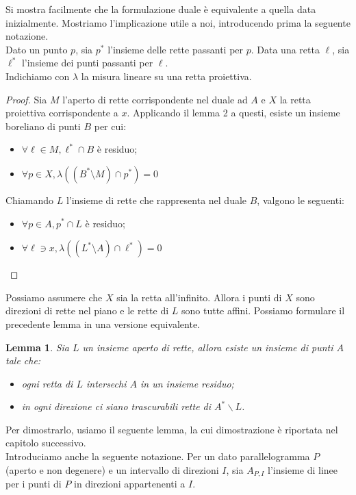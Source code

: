\documentclass[a4paper, twoside,openright]{article}
\newcommand{\fa}{\forall}
\newcommand{\<}{\langle}
\renewcommand{\>}{\rangle}
\newtheorem{lemma}[teo]{Lemma}
\begin{document}
	Si mostra facilmente che la formulazione duale è equivalente a quella data inizialmente. Mostriamo l'implicazione utile a noi, introducendo prima la seguente notazione.\\
	Dato un punto $p$, sia $p^*$ l'insieme delle rette passanti per $p$. Data una retta $\ell$, sia $\ell^*$ l'insieme dei punti passanti per $\ell$.\\
	Indichiamo con $\lambda$ la misura lineare su una retta proiettiva.
	
\begin{proof} 
	Sia $M$ l'aperto di rette corrispondente nel duale ad $A$ e $X$ la retta proiettiva corrispondente a $x$. Applicando il lemma 2 a questi, esiste un insieme boreliano di punti $B$ per cui:
	\begin{itemize}
		\item $\fa \ell \in M, \ell^* \cap B$ è residuo;
		\item $\fa p \in X, \lambda((B^* \setminus M) \cap p^*)=0$
	\end{itemize}
	Chiamando $L$ l'insieme di rette che rappresenta nel duale $B$, valgono le seguenti:
	\begin{itemize}
		\item 	$\fa p \in A, p^* \cap L$ è residuo;
		\item 	$\fa \ell \ni x, \lambda((L^* \setminus A) \cap \ell^*)=0$
	\end{itemize}
\end{proof}

Possiamo assumere che $X$ sia la retta all'infinito. Allora i punti di $X$ sono direzioni di rette nel piano e le rette di $L$ sono tutte affini. Possiamo formulare il precedente lemma in una versione equivalente.

\begin{lemma}
Sia $L$ un insieme aperto di rette, allora esiste un insieme di punti $A$ tale che:
\begin{itemize}
	\item ogni retta di $L$ intersechi $A$ in un insieme residuo;
	\item in ogni direzione ci siano trascurabili rette di  $A^{*} \backslash L$.
\end{itemize}
\end{lemma}

Per dimostrarlo, usiamo il seguente lemma, la cui dimostrazione è riportata nel capitolo successivo.\\
Introduciamo anche la seguente notazione. Per un dato parallelogramma $P$ (aperto e non degenere) e un intervallo di direzioni $I$, sia $A_{P, I}$ l'insieme di linee per i punti di $P$ in direzioni appartenenti a $I$.
\end{document}
